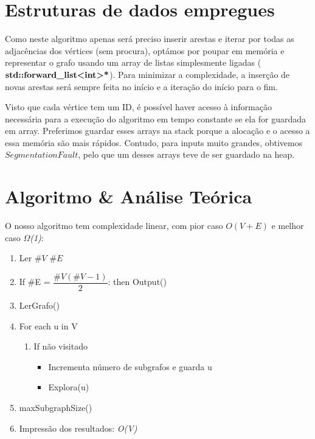 \documentclass[12pt]{article}
\begin{document}
\section{Estruturas de dados empregues}
    \par
    Como neste algoritmo apenas será preciso inserir arestas e iterar por todas as 
    adjacências dos vértices (sem procura), optámos por poupar em memória e representar o 
    grafo usando um array de listas simplesmente ligadas ($\textbf{std::forward\_list\textless int\textgreater*}$). 
    Para minimizar a complexidade, a inserção de novas arestas será sempre feita no início e a 
    iteração do início para o fim.
    \par
    Visto que cada vértice tem um ID, é possível haver acesso à informação necessária para a 
    execução do algoritmo em tempo constante se ela for guardada em array. Preferimos guardar 
    esses arrays na stack porque a alocação e o acesso a essa memória são mais rápidos. 
    Contudo, para inputs muito grandes, obtivemos $Segmentation Fault$, pelo que um desses 
    arrays teve de ser guardado na heap.
    
\section{Algoritmo \& Análise Teórica} 
    O nosso algoritmo tem complexidade linear, com pior caso \textit{$O(V+E)$} 
    e melhor caso \textit{$\Omega$(1)}:
    \vspace{1em}
    \begin{enumerate}
        \setlength\itemsep{0.2em}
        \item Ler \#$V$ \#$E$ 
        \item If \#E = $\dfrac{\#V(\#V-1)}{2}$: then Output()
        \item LerGrafo()
        \item For each u in V
        \begin{enumerate}
            \setlength\itemsep{0.2em}
            \item If não visitado
            \begin{itemize}
                \setlength\itemsep{0.2em}
                \item Incrementa número de subgrafos e guarda u
                \item Explora(u)
            \end{itemize}
        \end{enumerate}
        \item maxSubgraphSize()
        \item Impressão dos resultados: \textit{O(V)}
    \end{enumerate}
\end{document}
